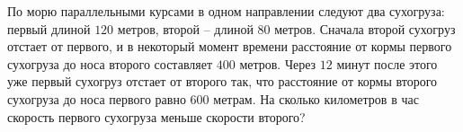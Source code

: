 \begin{ex}
	\begin{condition}
		По морю параллельными курсами в одном направлении следуют два сухогруза: первый длиной \(120\) метров, второй – длиной \(80\) метров. Сначала второй сухогруз отстает от первого, и в некоторый момент времени расстояние от кормы первого сухогруза до носа второго составляет \(400  \) метров. Через \(12\) минут после этого уже первый сухогруз отстает от второго так, что расстояние от кормы второго сухогруза до носа первого равно \( 600  \) метрам. На сколько километров в час скорость первого сухогруза меньше скорости второго?
	\end{condition}
\end{ex}